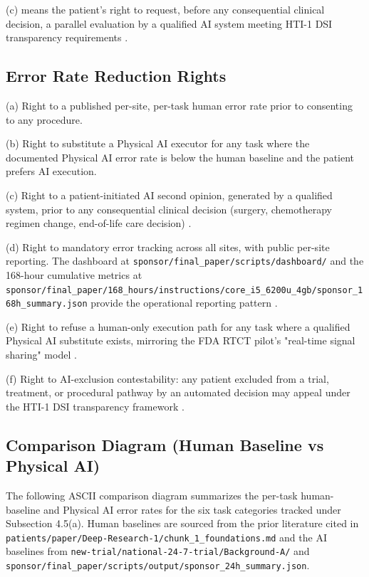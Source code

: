 (c)  means the
patient's right to request, before any consequential clinical
decision, a parallel evaluation by a qualified AI system meeting
HTI-1 DSI transparency requirements \cite{hti1_dsi_fact_sheet_2023}.

\subsection{Error Rate Reduction Rights}

(a) Right to a published per-site, per-task human error rate prior
to consenting to any procedure.

(b) Right to substitute a Physical AI executor for any task where
the documented Physical AI error rate is below the human baseline
and the patient prefers AI execution.

(c) Right to a patient-initiated AI second opinion, generated by a
qualified system, prior to any consequential clinical decision
(surgery, chemotherapy regimen change, end-of-life care decision)
\cite{hti1_dsi_fact_sheet_2023}.

(d) Right to mandatory error tracking across all sites, with public
per-site reporting. The dashboard at
\texttt{sponsor/final\_paper/scripts/dashboard/} and the 168-hour
cumulative metrics at
\texttt{sponsor/final\_paper/168\_hours/instructions/core\_i5\_6200u\_4gb/sponsor\_168h\_summary.json}
provide the operational reporting pattern
\cite{kawchak_2026_19396256}.

(e) Right to refuse a human-only execution path for any task where
a qualified Physical AI substitute exists, mirroring the FDA RTCT
pilot's "real-time signal sharing" model \cite{fda_rtct_press_2026}.

(f) Right to AI-exclusion contestability: any patient excluded from
a trial, treatment, or procedural pathway by an automated decision
may appeal under the HTI-1 DSI transparency framework
\cite{rank9_onc_hti1_2023, hti1_dsi_fact_sheet_2023}.

\subsection{Comparison Diagram (Human Baseline vs Physical AI)}

The following ASCII comparison diagram summarizes the per-task
human-baseline and Physical AI error rates for the six task
categories tracked under Subsection 4.5(a). Human baselines are
sourced from the prior literature cited in
\texttt{patients/paper/Deep-Research-1/chunk\_1\_foundations.md} and
the AI baselines from
\texttt{new-trial/national-24-7-trial/Background-A/} and
\texttt{sponsor/final\_paper/scripts/output/sponsor\_24h\_summary.json}.

